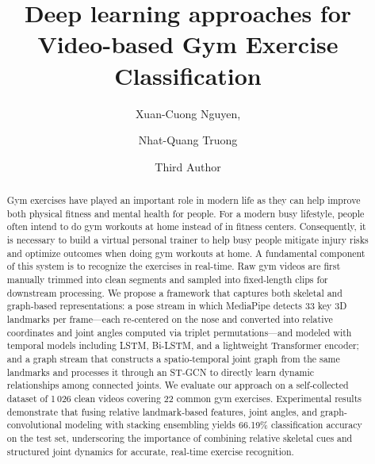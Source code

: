 \documentclass[runningheads]{llncs}
\begin{document}
%
\title{Deep learning approaches for Video-based Gym Exercise Classification}
%
%
\author{Xuan-Cuong Nguyen, \and
Nhat-Quang Truong \and
Third Author}
%
%
%
\maketitle              %
%
\begin{abstract}
Gym exercises have played an important role in modern life as they can help improve both physical fitness and mental health for people.
For a modern busy lifestyle, people often intend to do gym workouts at home instead of in fitness centers.
Consequently, it is necessary to build a virtual personal trainer to help busy people mitigate injury risks and optimize outcomes when doing gym workouts at home.
A fundamental component of this system is to recognize the exercises in real-time.
Raw gym videos are first manually trimmed into clean segments and sampled into fixed‐length clips for downstream processing. We propose a framework that captures both skeletal and graph‐based representations: a pose stream in which MediaPipe detects 33 key 3D landmarks per frame—each re‐centered on the nose and converted into relative coordinates and joint angles computed via triplet permutations—and modeled with temporal models including LSTM, Bi-LSTM, and a lightweight Transformer encoder; and a graph stream that constructs a spatio‐temporal joint graph from the same landmarks and processes it through an ST‐GCN to directly learn dynamic relationships among connected joints. We evaluate our approach on a self‐collected dataset of 1\,026 clean videos covering 22 common gym exercises. Experimental results demonstrate that fusing relative landmark‐based features, joint angles, and graph‐convolutional modeling with stacking ensembling yields 66.19\% classification accuracy on the test set, underscoring the importance of combining relative skeletal cues and structured joint dynamics for accurate, real‐time exercise recognition.
\end{abstract}
%
%
%
\end{document}
